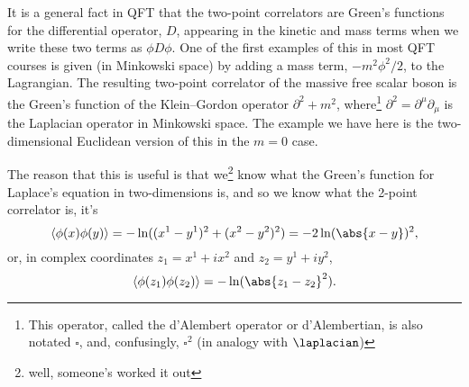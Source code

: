 \documentclass[fleqn]{NotesClass}
\DeclarePairedDelimiter{\correlator}{\langle}{\rangle}
\newcommand{\dalembertian}{\partial^2}
\begin{document}
    It is a general fact in QFT that the two-point correlators are Green's functions for the differential operator, \(D\), appearing in the kinetic and mass terms when we write these two terms as \(\phi D \phi\).
    One of the first examples of this in most QFT courses is given (in Minkowski space) by adding a mass term, \(-m^2\phi^2/2\), to the Lagrangian.
    The resulting two-point correlator of the massive free scalar boson is the Green's function of the Klein--Gordon operator \(\dalembertian + m^2\), where\footnote{This operator, called the d'Alembert operator or d'Alembertian, is also notated \(\square\), and, confusingly, \(\square^2\) (in analogy with \(\laplacian\))} \(\dalembertian = \partial^\mu \partial_\mu\) is the Laplacian operator in Minkowski space.
    The example we have here is the two-dimensional Euclidean version of this in the \(m = 0\) case.
    
    The reason that this is useful is that we\footnote{well, someone's worked it out} know what the Green's function for Laplace's equation in two-dimensions is, and so we know what the 2-point correlator is, it's
    \begin{equation}
        \correlator{\phi(x)\phi(y)} = -\ln((x^1 - y^1)^2 + (x^2 - y^2)^2) = -2\ln(\abs{x - y})^2,
    \end{equation}
    or, in complex coordinates \(z_1 = x^1 + ix^2\) and \(z_2 = y^1 + iy^2\),
    \begin{equation}
        \correlator{\phi(z_1)\phi(z_2)} = -\ln(\abs{z_1 - z_2}^2).
    \end{equation}
    
    
    
\end{document}
